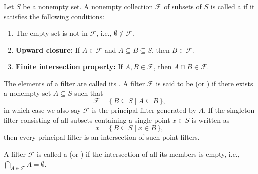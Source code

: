 \begin{definition} \label{definition:filter_on_a_set}

    Let $S$ be a nonempty set. A nonempty collection $\mathcal{F}$ of subsets of $S$ is called a  if it satisfies the following conditions:
    \begin{enumerate}
        \item The empty set is not in $\mathcal{F}$, i.e., $\emptyset \notin \mathcal{F}$.
        \item \textbf{Upward closure:} If $A \in \mathcal{F}$ and $A \subseteq B \subseteq S$, then $B \in \mathcal{F}$.
        \item \textbf{Finite intersection property:} If $A, B \in \mathcal{F}$, then $A \cap B \in \mathcal{F}$.
    \end{enumerate}

    The elements of a filter are called its . A filter $\mathcal{F}$ is said to be  (or ) if there exists a nonempty set $A \subseteq S$ such that
    $$\mathcal{F} = \{\, B \subseteq S \mid A \subseteq B \,\},$$
    in which case we also say $\mathcal{F}$ is the principal filter generated by $A$. If the singleton filter consisting of all subsets containing a single point $x \in S$ is written as
    $$\dot{x} = \{\, B \subseteq S \mid x \in B \,\},$$
    then every principal filter is an intersection of such point filters.

    A filter $\mathcal{F}$ is called a  (or ) if the intersection of all its members is empty, i.e., $\bigcap_{A \in \mathcal{F}} A = \emptyset$.
\end{definition}
